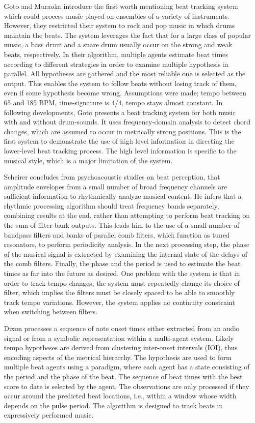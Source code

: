 \documentclass{scrartcl}
\begin{document}
Goto and Muraoka \cite{Goto1994} introduce the first worth mentioning beat tracking system which could process music played on ensembles of a variety of instruments. However, they restricted their system to rock and pop music in which drums maintain the beats. The system leverages the fact that for a large class of popular music, a bass drum and a snare drum usually occur on the strong and weak beats, respectively. In their algorithm, multiple agents estimate beat times according to different strategies in order to examine multiple hypothesis in parallel. All hypotheses are gathered and the most reliable one is selected as the output. This enables the system to follow beats without losing track of them, even if some hypothesis become wrong. Assumptions were made; tempo between 65 and 185 BPM, time-signature is 4/4, tempo stays almost constant. In following developments, Goto \cite{Goto2001} presents a beat tracking system for both music with and without drum-sounds. It uses frequency-domain analysis to detect chord changes, which are assumed to occur in metrically strong positions. This is the first system to demonstrate the use of high level information in directing the lower-level beat tracking process. The high level information is specific to the musical style, which is a major limitation of the system.  

Scheirer \cite{Scheirer1998} concludes from psychoacoustic studies on beat perception, that amplitude envelopes from a small number of broad frequency channels are sufficient information to rhythmically analyze musical content. He infers that a rhythmic processing algorithm should treat frequency bands separately, combining results at the end, rather than attempting to perform beat tracking on the sum of filter-bank outputs. This leads him to the use of a small number of bandpass filters and banks of parallel comb filters, which function as tuned resonators, to perform periodicity analysis. In the next processing step, the phase of the musical signal is extracted by examining the internal state of the delays of the comb filters. Finally, the phase and the period is used to estimate the beat times as far into the future as desired. One problem with the system is that in order to track tempo changes, the system must repeatedly change its choice of filter, which implies the filters must be closely spaced to be able to smoothly track tempo variations. However, the system applies no continuity constraint when switching between filters.  

Dixon \cite{Dixon2001} processes a sequence of note onset times either extracted from an audio signal or from a symbolic representation within a multi-agent system. Likely tempo hypotheses are derived from clustering inter-onset intervals (IOI), thus encoding aspects of the metrical hierarchy. The hypothesis are used to form multiple beat agents using a paradigm, where each agent has a state consisting of the period and the phase of the beat. The sequence of beat times with the best score to date is selected by the agent. The observations are only processed if they occur around the predicted beat locations, i.e., within a window whose width depends on the pulse period. The algorithm is designed to track beats in expressively performed music.
\end{document}

